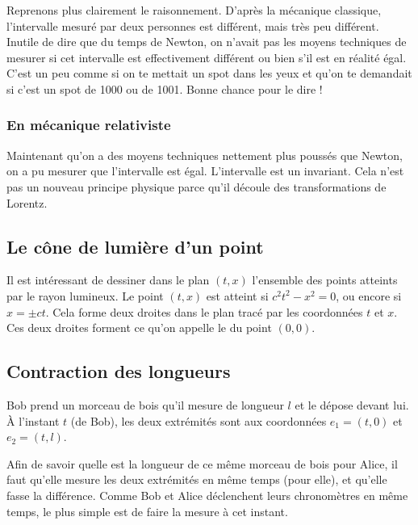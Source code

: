 Reprenons plus clairement le raisonnement. D'après la mécanique classique, l'intervalle mesuré par deux personnes est différent, mais très peu différent. Inutile de dire que du temps de Newton, on n'avait pas les moyens techniques de mesurer si cet intervalle est effectivement différent ou bien s'il est en réalité égal. C'est un peu comme si on te mettait un spot dans les yeux et qu'on te demandait si c'est un spot de \unit{1000}{\watt} ou de \unit{1001}{\watt}. Bonne chance pour le dire !

\subsubsection{En mécanique relativiste}

 Maintenant qu'on a des moyens techniques nettement plus poussés que Newton, on a pu mesurer que l'intervalle est égal. L'intervalle est un invariant. Cela n'est pas un nouveau principe physique parce qu'il découle des transformations de Lorentz.


\subsection{Le cône de lumière d'un point}


Il est intéressant de dessiner dans le plan $(t,x)$ l'ensemble des points atteints par le rayon lumineux. Le point $(t,x)$ est atteint si $c^2t^2-x^2=0$, ou encore si $x=\pm ct$. Cela forme deux droites dans le plan tracé par les coordonnées $t$ et $x$. Ces deux droites forment ce qu'on appelle le  du point $(0,0)$.

\subsection{Contraction des longueurs}

Bob prend un morceau de bois qu'il mesure de longueur $l$ et le dépose devant lui. À l'instant $t$ (de Bob), les deux extrémités sont aux coordonnées $e_1=(t,0)$ et $e_2=(t,l)$.

Afin de savoir quelle est la longueur de ce même morceau de bois pour Alice, il faut qu'elle mesure les deux extrémités en même temps (pour elle), et qu'elle fasse la différence. Comme Bob et Alice déclenchent leurs chronomètres en même temps, le plus simple est de faire la mesure à cet instant.

